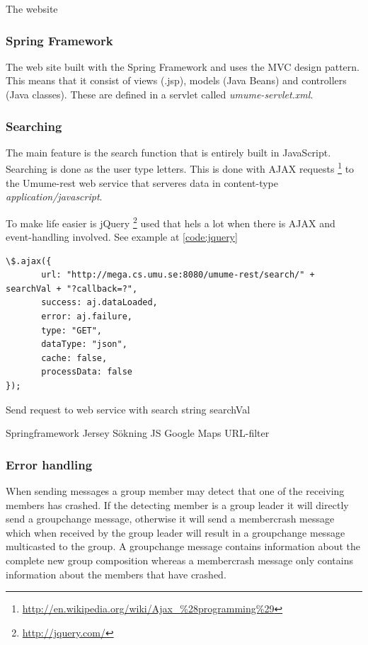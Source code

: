 \documentclass[titlepage, twocolumn, a4paper, 10pt]{article}
\begin{document}
The website 

\subsubsection{Spring Framework}\label{springframework}
The web site built with the Spring Framework and uses the MVC 
design pattern. This means that it consist of views (.jsp), models (Java Beans)
and controllers (Java classes). These are defined in a servlet called 
\textit{umume-servlet.xml}.

\subsubsection{Searching}\label{sec:web-search}
The main feature is the search function that is entirely built 
in JavaScript. Searching is done as the user type letters. This
is done with AJAX requests 
\footnote{\url{http://en.wikipedia.org/wiki/Ajax_\%28programming\%29}}
to the Umume-rest web service that serveres data in content-type 
\textit{application/javascript}. 

To make life easier is jQuery \footnote{\url{http://jquery.com/}} used that hels a lot when there is 
AJAX and event-handling involved. See example at \ref{code:jquery}

\begin{code}
  \begin{footnotesize}
\begin{verbatim}
\$.ajax({
       url: "http://mega.cs.umu.se:8080/umume-rest/search/" + searchVal + "?callback=?",
       success: aj.dataLoaded,
       error: aj.failure,
       type: "GET",
       dataType: "json",
       cache: false,
       processData: false
});
\end{verbatim}
  \end{footnotesize}
  \caption{Send request to web service with search string {searchVal}}\label{code:jquery}
\end{code}            



Springframework
Jersey
Sökning JS
Google Maps
URL-filter



\subsubsection{Error handling}\label{sec:error-handling}
When sending messages a group member may detect that one of the
receiving members has crashed. If the detecting member is a group
leader it will directly send a groupchange message, otherwise it will
send a membercrash message which when received by the group leader
will result in a groupchange message multicasted to the group. A
groupchange message contains information about the complete new group
composition whereas a membercrash message only contains information
about the members that have crashed.
\end{document}
